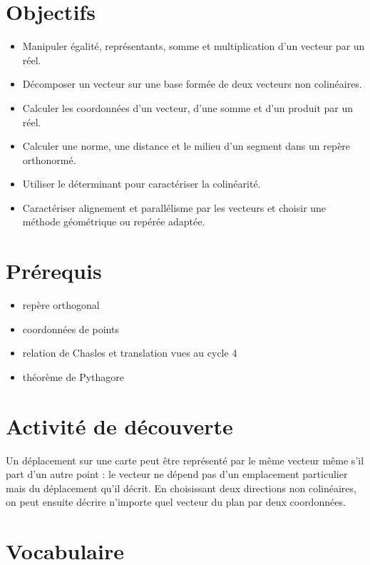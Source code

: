 \section{Objectifs}

\begin{itemize}
\item Manipuler égalité, représentants, somme et multiplication d'un vecteur par un réel.
\item Décomposer un vecteur sur une base formée de deux vecteurs non colinéaires.
\item Calculer les coordonnées d'un vecteur, d'une somme et d'un produit par un réel.
\item Calculer une norme, une distance et le milieu d'un segment dans un repère orthonormé.
\item Utiliser le déterminant pour caractériser la colinéarité.
\item Caractériser alignement et parallélisme par les vecteurs et choisir une méthode géométrique ou repérée adaptée.
\end{itemize}

\section{Prérequis}

\begin{itemize}
\item repère orthogonal
\item coordonnées de points
\item relation de Chasles et translation vues au cycle 4
\item théorème de Pythagore
\end{itemize}

\section{Activité de découverte}

Un déplacement sur une carte peut être représenté par le même vecteur même s'il part d'un autre point : le vecteur ne dépend pas d'un emplacement particulier mais du déplacement qu'il décrit. En choisissant deux directions non colinéaires, on peut ensuite décrire n'importe quel vecteur du plan par deux coordonnées.

\section{Vocabulaire}

